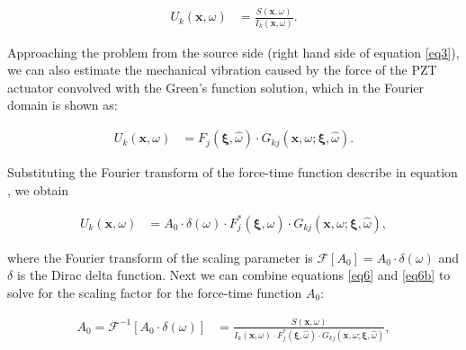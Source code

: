 \documentclass[preprint,3p, 11pt,authoryear]{elsarticle}
\begin{document}
{\begin{equation}
    \label{eq6}
\begin{split}
U_{k}\left( \mathbf{x}, \omega \right) & = 
        \frac{S\left( \mathbf{x}, \omega \right) }{ I_{k}\left( \mathbf{x},\omega \right)}.
\end{split}
\end{equation}

Approaching the problem from the source side (right hand side of equation \eqref{eq3}), we can also estimate the mechanical vibration caused by the force of the PZT actuator convolved with the Green's function solution, which in the Fourier domain is shown as:

\begin{equation}
    \label{eq6a}
\begin{split}
U_{k}\left( \mathbf{x}, \omega \right) & = 
       F_{j}\left( \mathbf{\xi}, \hat{\omega} \right)  \cdot G_{kj}\left(  \mathbf{x}, \omega; \mathbf{\xi}, \hat{\omega}\right).
\end{split}
\end{equation}

\noindent Substituting the Fourier transform of the force-time function describe in equation , we obtain

\begin{equation}
    \label{eq6b}
\begin{split}
U_{k}\left( \mathbf{x}, \omega \right) & = 
       A_{0}\cdot \delta (\omega)\cdot F^{*}_{j}\left( \mathbf{\xi}, \hat{\omega} \right)  \cdot G_{kj}\left(  \mathbf{x}, \omega; \mathbf{\xi}, \hat{\omega}\right),
\end{split}
\end{equation}

\noindent where the Fourier transform of the scaling parameter is $\mathcal{F}[A_{0}] = A_{0}\cdot\delta(\omega)$ and $\delta$ is the Dirac delta function.  Next we can combine equations \eqref{eq6} and \eqref{eq6b} to solve for the scaling factor for the force-time function $A_{0}$:


\begin{equation}
    \label{eq6b}
\begin{split}
A_{0} = \mathcal{F} ^{-1}[A_{0}\cdot \delta (\omega)] & = \frac{S\left( \mathbf{x}, \omega \right) } 
{ I_{k}\left( \mathbf{x},\omega \right)\cdot F^{*}_{j}\left( \mathbf{\xi}, \hat{\omega} \right)  \cdot G_{kj}\left(  \mathbf{x}, \omega; \mathbf{\xi}, \hat{\omega}\right)},
\end{split}
\end{equation}

}
\end{document}
